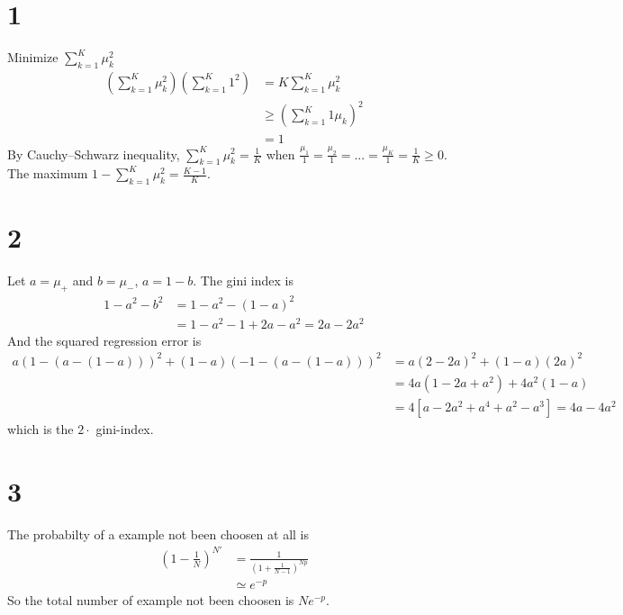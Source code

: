 \documentclass[12pt]{article}
\begin{document}
\maketitle


\section*{1}
Minimize $\sum_{k=1}^K \mu_k^2$
\begin{equation*}
\begin{split}
    (\sum_{k=1}^K \mu_k^2)(\sum_{k=1}^K 1^2) &= K \sum_{k=1}^K \mu_k^2 \\
    &\geq (\sum_{k=1}^K 1\mu_k)^2 \\
    &= 1
\end{split}
\end{equation*}
By Cauchy–Schwarz inequality, $\sum_{k=1}^K \mu_k^2 = \frac{1}{K}$ when 
$\frac{\mu_1}{1} = \frac{\mu_2}{1} = ... = \frac{\mu_K}{1} = \frac{1}{K} \geq 0$.
The maximum $1 - \sum_{k=1}^K \mu_k^2 = \frac{K-1}{K}$.

\section*{2}
Let $a=\mu_+$ and $b=\mu_-$, $a=1-b$.
The gini index is
\begin{equation*}
\begin{split}
    1 - a^2 - b^2 &= 1 - a^2 - (1-a)^2 \\
    &= 1 - a^2 - 1 + 2a - a^2 = 2a - 2a^2
\end{split}
\end{equation*}
And the squared regression error is 
\begin{equation*}
\begin{split}
    a(1-(a - (1-a)))^2 + (1-a)(-1 - (a-(1-a)))^2 
    &= a(2-2a)^2 + (1-a)(2a)^2 \\
    &= 4a(1-2a+a^2) + 4a^2(1-a) \\
    &= 4[a-2a^2 + a^4 + a^2 - a^3] = 4a - 4a^2
\end{split}
\end{equation*}
which is the $2 \cdot$ gini-index.

\section*{3}
The probabilty of a example not been choosen at all is 
\begin{equation*}
\begin{split}
    (1 - \frac{1}{N})^{N'} &= \frac{1}{(1+\frac{1}{N-1})^{Np}} \\
    &\simeq e^{-p}
\end{split}
\end{equation*}
So the total number of example not been choosen is $Ne^{-p}$.
\end{document}
